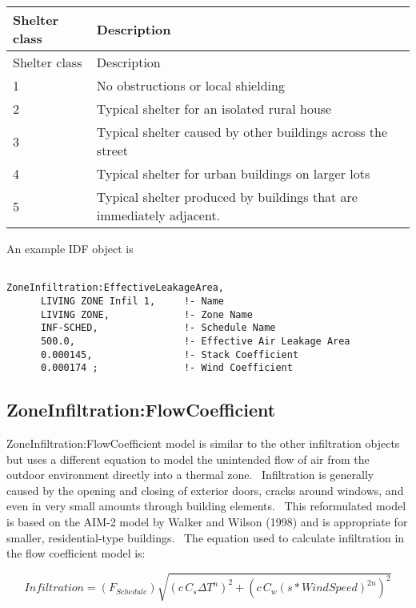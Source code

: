 \begin{longtable}[c]{p{1.5in}p{4.5in}}
\toprule
Shelter class & Description \tabularnewline
\midrule
\endfirsthead

\toprule
Shelter class & Description \tabularnewline
\midrule
\endhead

1 & No obstructions or local shielding \tabularnewline
2 & Typical shelter for an isolated rural house \tabularnewline
3 & Typical shelter caused by other buildings across the street \tabularnewline
4 & Typical shelter for urban buildings on larger lots \tabularnewline
5 & Typical shelter produced by buildings that are immediately adjacent. \tabularnewline
\bottomrule
\end{longtable}

An example IDF object is

\begin{lstlisting}

ZoneInfiltration:EffectiveLeakageArea,
      LIVING ZONE Infil 1,     !- Name
      LIVING ZONE,             !- Zone Name
      INF-SCHED,               !- Schedule Name
      500.0,                   !- Effective Air Leakage Area
      0.000145,                !- Stack Coefficient
      0.000174 ;               !- Wind Coefficient
\end{lstlisting}

\subsection{ZoneInfiltration:FlowCoefficient}\label{zoneinfiltrationflowcoefficient}

ZoneInfiltration:FlowCoefficient model is similar to the other infiltration objects but uses a different equation to model the unintended flow of air from the outdoor environment directly into a thermal zone.~ Infiltration is generally caused by the opening and closing of exterior doors, cracks around windows, and even in very small amounts through building elements.~ This reformulated model is based on the AIM-2 model by Walker and Wilson (1998) and is appropriate for smaller, residential-type buildings.~ The equation used to calculate infiltration in the flow coefficient model is:

\begin{equation}
Infiltration = \left( {{F_{Schedule}}} \right)\sqrt {{{\left( {c\,{C_s}\Delta {T^n}} \right)}^2} + {{\left( {c\,{C_w}{{\left( {s * WindSpeed} \right)}^{2n}}} \right)}^2}}
\end{equation}

